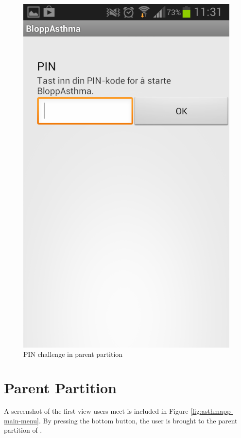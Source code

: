 \begin{figure}
\begin{minipage}[t]{0.4\linewidth}
			\includegraphics[width=0.20\paperwidth]{Pictures/new-screenshots/pin-challenge.png}
		\caption{PIN challenge in parent partition}
		\label{fig:parent-pin}
	\end{minipage}
\end{figure}

\section{Parent Partition}
\label{sec:parentpartition}

A screenshot of the first view users meet is included in Figure \ref{fig:asthmapp-main-menu}. By pressing the bottom button, the user is brought to the parent partition of \app{}. 

